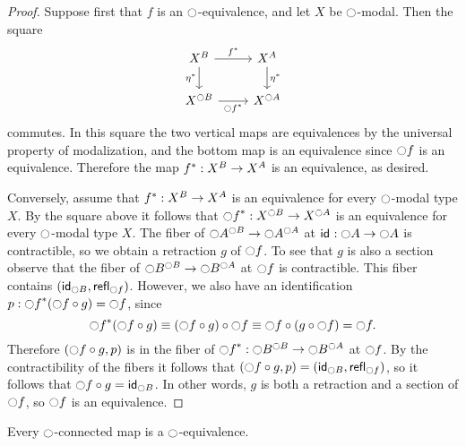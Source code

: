 \begin{proof} 
Suppose first that $f$ is an $\modal$-equivalence, and let $X$ be $\modal$-modal. Then the square
\begin{equation*}
\begin{tikzcd}
X^B \arrow[r,"\precomp{f}"] \arrow[d,swap,"\precomp{\eta}"] & X^A \arrow[d,"\precomp{\eta}"] \\
X^{\modal B} \arrow[r,swap,"\precomp{\modal f}"] & X^{\modal A}
\end{tikzcd}
\end{equation*}
commutes. In this square the two vertical maps are equivalences by the universal property of modalization, and the bottom map is an equivalence since $\modal f$ is an equivalence. Therefore the map $\precomp{f}:X^B\to X^A$ is an equivalence, as desired.

Conversely, assume that $\precomp{f} : X^B \to X^A$ is an equivalence for every $\modal$-modal type $X$. By the square above it follows that $\precomp{\modal f}:X^{\modal B}\to X^{\modal A}$ is an equivalence for every $\modal$-modal type $X$. The fiber of $\modal A^{\modal B}\to \modal A^{\modal A}$ at $\idfunc:\modal A\to \modal A$ is contractible, so we obtain a retraction $g$ of $\modal f$. To see that $g$ is also a section observe that the fiber of $\modal B^{\modal B}\to \modal B^{\modal A}$ at $\modal f$ is contractible. This fiber contains $(\idfunc[\modal B],\refl{\modal f})$. However, we also have an identification $p:\precomp{\modal f}(\modal f\circ g)=\modal f$, since
\begin{equation*}
\precomp{\modal f}(\modal f\circ g)\jdeq (\modal f \circ g)\circ \modal f\jdeq \modal f \circ (g\circ \modal f) = \modal f. 
\end{equation*}
Therefore $(\modal f\circ g,p)$ is in the fiber of $\precomp{\modal f}:\modal B^{\modal B}\to \modal B^{\modal A}$ at $\modal f$. By the contractibility of the fibers it follows that $(\modal f\circ g,p)=(\idfunc[\modal B],\refl{\modal f})$, so it follows that $\modal f\circ g=\idfunc[\modal B]$. In other words, $g$ is both a retraction and a section of $\modal f$, so $\modal f$ is an equivalence.
\end{proof}

\begin{cor}\label{cor:mequiv_mconn}
Every $\modal$-connected map is a $\modal$-equivalence.
\end{cor}

